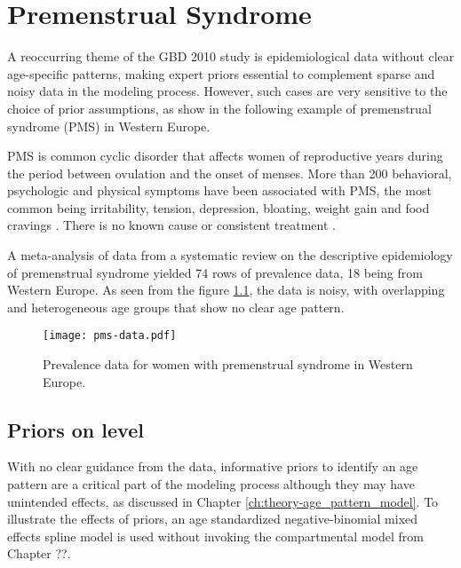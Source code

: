 \chapter{Premenstrual Syndrome}
\label{applications-priors_knots_select}

A reoccurring theme of the GBD 2010 study is epidemiological data without clear age-specific patterns, making expert priors essential to complement sparse and noisy data in the modeling process.  However, such cases are very sensitive to the choice of prior assumptions, as show in the following example of premenstrual syndrome (PMS) in Western Europe.

PMS is common cyclic disorder that affects women of reproductive years during the period between ovulation and the onset of menses.  More than 200 behavioral, psychologic and physical symptoms have been associated with PMS, the most common being irritability, tension, depression, bloating, weight gain and food cravings \cite{dickerson_premenstrual_2003, singh_incidence_1998}.  There is no known cause or consistent treatment \cite{goodale_alleviation_1990}.

A meta-analysis of data from a systematic review on the descriptive epidemiology of premenstrual syndrome yielded 74 rows of prevalence data, 18 being from Western Europe.  As seen from the figure \ref{fig:app-pms_data}, the data is noisy, with overlapping and heterogeneous age groups that show no clear age pattern.

    \begin{figure}[h]
        \begin{center}
            \texttt{[image: pms-data.pdf]}
            \caption{Prevalence data for women with premenstrual syndrome in Western Europe.}
        \end{center}
        \label{fig:app-pms_data}
    \end{figure}

\section{Priors on level} \label{sec:app-priors on level}
With no clear guidance from the data, informative priors to identify an age pattern are a critical part of the modeling process although they may have unintended effects, as discussed in Chapter \ref{ch:theory-age_pattern_model}.  To illustrate the effects of priors, an age standardized negative-binomial mixed effects spline model is used without invoking the compartmental model from Chapter ??.

